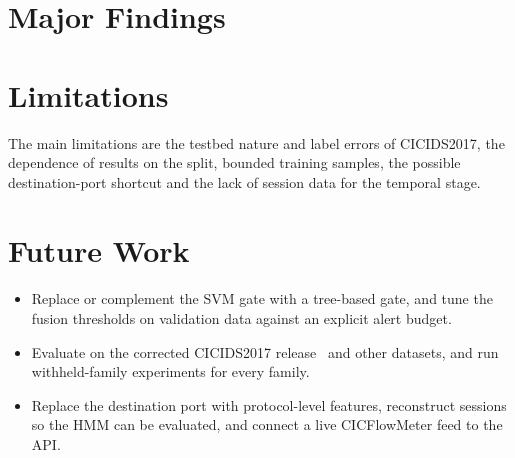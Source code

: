 \documentclass[12pt,a4paper,oneside]{report}
\begin{document}
\section{Major Findings}


\section{Limitations}
The main limitations are the testbed nature and label errors of CICIDS2017, the dependence of results on the split, bounded training samples, the possible destination-port shortcut and the lack of session data for the temporal stage.

\section{Future Work}
\begin{itemize}
    \item Replace or complement the SVM gate with a tree-based gate, and tune the fusion thresholds on validation data against an explicit alert budget.
    \item Evaluate on the corrected CICIDS2017 release~\cite{engelen2021troubleshooting} and other datasets, and run withheld-family experiments for every family.
    \item Replace the destination port with protocol-level features, reconstruct sessions so the HMM can be evaluated, and connect a live CICFlowMeter feed to the API.
\end{itemize}
\end{document}
